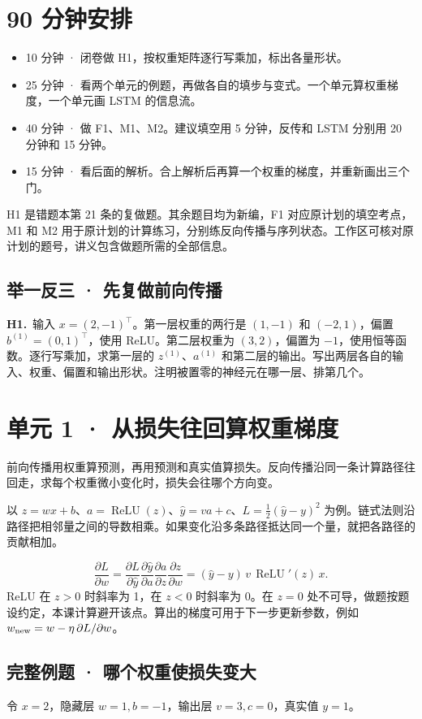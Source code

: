 \documentclass[UTF8,a4paper,11pt]{ctexart}
\newcommand{\PracticeQuestion}[3]{\par\Needspace{4\baselineskip}\noindent\begin{minipage}{\linewidth}\textbf{#1.}\ #2\par\noindent\rule{0pt}{#3mm}\par\end{minipage}\par}
\begin{document}
\section{90 分钟安排}
\begin{itemize}
\item 10 分钟 · 闭卷做 H1，按权重矩阵逐行写乘加，标出各量形状。
\item 25 分钟 · 看两个单元的例题，再做各自的填步与变式。一个单元算权重梯度，一个单元画 LSTM 的信息流。
\item 40 分钟 · 做 F1、M1、M2。建议填空用 5 分钟，反传和 LSTM 分别用 20 分钟和 15 分钟。
\item 15 分钟 · 看后面的解析。合上解析后再算一个权重的梯度，并重新画出三个门。
\end{itemize}
H1 是错题本第 21 条的复做题。其余题目均为新编，F1 对应原计划的填空考点，M1 和 M2 用于原计划的计算练习，分别练反向传播与序列状态。工作区可核对原计划的题号，讲义包含做题所需的全部信息。

\subsection{举一反三 · 先复做前向传播}
\PracticeQuestion{H1}{输入 $x=(2,-1)^\top$。第一层权重的两行是 $(1,-1)$ 和 $(-2,1)$，偏置 $b^{(1)}=(0,1)^\top$，使用 ReLU。第二层权重为 $(3,2)$，偏置为 $-1$，使用恒等函数。逐行写乘加，求第一层的 $z^{(1)}$、$a^{(1)}$ 和第二层的输出。写出两层各自的输入、权重、偏置和输出形状。注明被置零的神经元在哪一层、排第几个。}{55}
\clearpage
\section{单元 1 · 从损失往回算权重梯度}
前向传播用权重算预测，再用预测和真实值算损失。反向传播沿同一条计算路径往回走，求每个权重微小变化时，损失会往哪个方向变。

以 $z=wx+b$、$a=\operatorname{ReLU}(z)$、$\hat y=va+c$、$L=\tfrac12(\hat y-y)^2$ 为例。链式法则沿路径把相邻量之间的导数相乘。如果变化沿多条路径抵达同一个量，就把各路径的贡献相加。

\[\frac{\partial L}{\partial w}=\frac{\partial L}{\partial\hat y}\frac{\partial\hat y}{\partial a}\frac{\partial a}{\partial z}\frac{\partial z}{\partial w}=(\hat y-y)\,v\,\operatorname{ReLU}'(z)\,x.\]
ReLU 在 $z>0$ 时斜率为 1，在 $z<0$ 时斜率为 0。在 $z=0$ 处不可导，做题按题设约定，本课计算避开该点。算出的梯度可用于下一步更新参数，例如 $w_{\rm new}=w-\eta\,\partial L/\partial w$。

\subsection{完整例题 · 哪个权重使损失变大}
令 $x=2$，隐藏层 $w=1,b=-1$，输出层 $v=3,c=0$，真实值 $y=1$。
\end{document}
